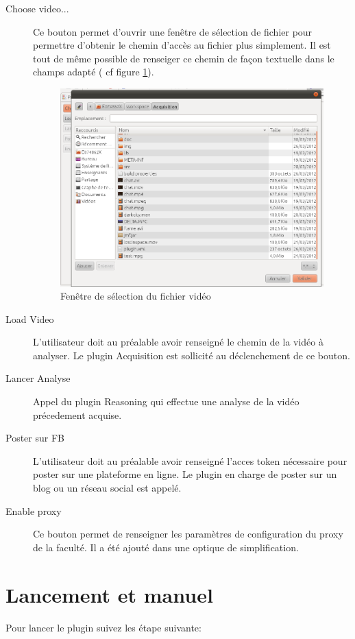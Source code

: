 \begin{description}
\item[Choose video...]
Ce bouton permet d'ouvrir une fenêtre de sélection de fichier pour permettre d'obtenir le chemin d'accès au fichier plus simplement. Il est tout de même possible de renseiger ce chemin de façon textuelle dans le champs adapté ( cf figure \ref{fig:choix}).
  \begin{figure}[h]
	  \centering
	  \includegraphics[scale=0.50]{img/choixvideo}
	  \caption{Fenêtre de sélection du fichier vidéo}
	  \label{fig:choix}
\end{figure} 
\item[Load Video]
L'utilisateur doit au préalable avoir renseigné le chemin de la vidéo à analyser. Le plugin Acquisition est sollicité au déclenchement de ce bouton. 
\item[Lancer Analyse]
Appel du plugin Reasoning qui effectue une analyse de la vidéo précedement acquise.
\item[Poster sur FB]
L'utilisateur doit au préalable avoir renseigné l'acces token nécessaire pour poster sur une plateforme en ligne. 
Le plugin en charge de poster sur un blog ou un réseau social est appelé.
\item[Enable proxy]
Ce bouton permet de renseigner les paramètres de configuration du proxy de la faculté. Il a été ajouté dans une optique de simplification.
\end{description}
 
 \clearpage
 
\section{Lancement et manuel}
Pour lancer le plugin suivez les étape suivante:

